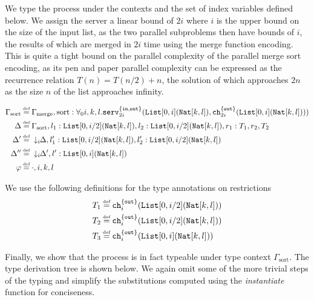 We type the process under the contexts and the set of index variables defined below. We assign the server a linear bound of $2i$ where $i$ is the upper bound on the size of the input list, as the two parallel subproblems then have bounds of $i$, the results of which are merged in $2i$ time using the merge function encoding. This is quite a tight bound on the parallel complexity of the parallel merge sort encoding, as its pen and paper parallel complexity can be expressed as the recurrence relation $T(n) = T(n/2) + n$, the solution of which approaches $2n$ as the size $n$ of the list approaches infinity.

\begin{align*}
    \Gamma_{\text{sort}} \defeq&\; \Gamma_{\text{merge}},\text{sort} : \forall_0{i,k,l}.\texttt{serv}^{\{\texttt{in},\texttt{out}\}}_{2i}(\texttt{List}[0,i](\texttt{Nat}[k,l]),\texttt{ch}^{\{\texttt{out}\}}_{2i}(\texttt{List}[0,i](\texttt{Nat}[k,l])))\\
    \Delta \defeq&\; \Gamma_{\text{sort}}, l_1 : \texttt{List}[0,i/2](\texttt{Nat}[k,l]), l_2 : \texttt{List}[0,i/2](\texttt{Nat}[k,l]), r_1 : T_1, r_2, T_2 \\
    \Delta' \defeq&\; \downarrow_i\!\!\Delta,l_1' : \texttt{List}[0,i/2](\texttt{Nat}[k,l]), l_2' : \texttt{List}[0,i/2](\texttt{Nat}[k,l]) \\
    \Delta'' \defeq&\; \downarrow_i\!\!\Delta', l' : \texttt{List}[0,i](\texttt{Nat}[k,l]) \\
    \varphi\defeq&\; \cdot,i,k,l
\end{align*}

We use the following definitions for the type annotations on restrictions
\begin{align*}
    T_1 \defeq&\; \texttt{ch}^{\{\texttt{out}\}}_{i}(\texttt{List}[0,i/2](\texttt{Nat}[k,l])) \\
    T_2 \defeq&\; \texttt{ch}^{\{\texttt{out}\}}_{i}(\texttt{List}[0,i/2](\texttt{Nat}[k,l])) \\
    T_3 \defeq&\; \texttt{ch}^{\{\texttt{out}\}}_{i}(\texttt{List}[0,i](\texttt{Nat}[k,l]))
\end{align*}

Finally, we show that the process is in fact typeable under type context $\Gamma_{\text{sort}}$. The type derivation tree is shown below. We again omit some of the more trivial steps of the typing and simplify the substitutions computed using the \textit{instantiate} function for conciseness.

